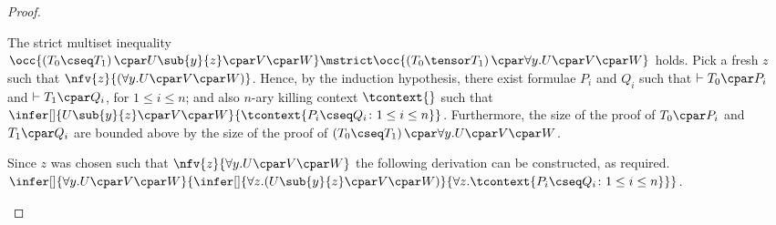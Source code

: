 \documentclass[UKenglish,acmsmall,authorversion]{acmart}
\theoremstyle{plain}
\begin{document}
{\begin{proof}
\begin{enumerate}[label=\textbf{\Alph*},ref=\Alph*,leftmargin=*]
{The strict multiset inequality $
\occ{ \left(T_0 \cseq T_1\right) \cpar U\sub{y}{z} \cpar V \cpar W } \mstrict \occ{ \left(T_0 \tensor T_1\right) \cpar \forall y. U \cpar V \cpar W }
$ holds.
Pick a fresh $z$ such that $\nfv{z}{(\forall y. U \cpar V \cpar W)}$.
Hence, by the induction hypothesis, there exist formulae $P_i$ and $Q_i$ such that $\vdash T_0 \cpar P_i$ and $\vdash T_1 \cpar Q_i$, for $1 \leq i \leq n$; and also $n$-ary killing context $\tcontext{}$ such that
$
\infer[]{
U\sub{y}{z} \cpar V \cpar W
}{
\tcontext{ P_i \cseq Q_i \colon 1 \leq i \leq n }
}
$.
Furthermore, the size of the proof of $T_0 \cpar P_i$ and $T_1 \cpar Q_i$ are bounded above by the size of the proof of $\left(T_0 \cseq T_1\right) \cpar \forall y. U \cpar V \cpar W$.

Since $z$ was chosen such that $\nfv{z}{ \forall y. U \cpar V \cpar W }$ the following derivation can be constructed, as required.
$
\infer[]{
\forall y. U \cpar V \cpar W
}{
\infer[]{
\mathopen{\forall z.} \left( U\sub{y}{z} \cpar V \cpar W \right) 
}{
\forall z. \tcontext{ P_i \cseq Q_i \colon 1 \leq i \leq n }
}}
$.
\smallskip


}
\end{enumerate}
\end{proof}}
\end{document}
